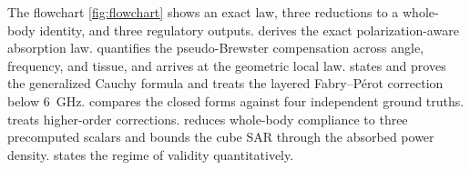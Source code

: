 \documentclass[journal,twocolumn,10pt]{IEEEtran}
\theoremstyle{plain}
\theoremstyle{remark}
\begin{document}
The flowchart \cref{fig:flowchart} shows an exact law, three
reductions to a whole-body identity, and three regulatory outputs.
 derives the exact
polarization-aware absorption law.  quantifies the
pseudo-Brewster compensation across angle, frequency, and tissue, and
arrives at the geometric local law.  states and proves
the generalized Cauchy formula and treats the layered Fabry--P\'erot
correction below 6~GHz.  compares the closed forms
against four independent ground truths.  treats
higher-order corrections.  reduces whole-body
compliance to three precomputed scalars and bounds the cube SAR
through the absorbed power density.  states the
regime of validity quantitatively.
\end{document}
